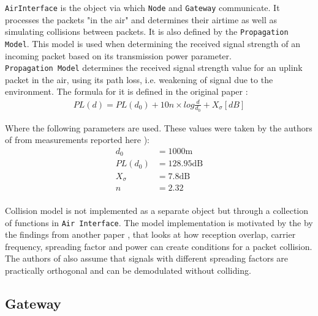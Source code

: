 \texttt{AirInterface} is the object via which \texttt{Node} and \texttt{Gateway} communicate. It processes the packets "in the air" and determines their airtime as well as simulating collisions between packets. It is also defined by the \texttt{Propagation Model}.
This model is used when determining the received signal
strength of an incoming packet based on its transmission power parameter. \\

\texttt{Propagation Model} determines the received signal strength value for an uplink packet in the air, 
using its path loss, i.e. weakening of signal due to
the environment. The formula for it is defined in the original paper \cite{simulator} :
\begin{align}
    PL(d) = PL(d_0) + 10n\times log\frac{d}{d_0} + X_{\sigma} [dB] \label{eq:propagation_model}
\end{align}

Where the following parameters are used. These values were taken by the authors of \cite{simulator} from measurements reported here \cite{propagation_model_parameters}):
\begin{align*}
     d_0 & = 1000 \text{m}\\
     PL(d_0) & = 128.95 \text{dB}\\
     X_{\sigma} & = 7.8 \text{dB}\\
     n & = 2.32\\
\end{align*}

Collision model is not implemented as a separate object but through a collection of functions in \texttt{Air Interface}. The model implementation is motivated by the by the findings from another paper \cite{collision_conditions}, that looks at how reception overlap, carrier frequency, spreading factor and power can create conditions for a packet collision. The authors of \cite{simulator} also assume that signals with different spreading factors are practically orthogonal and can be demodulated without colliding.\\


\subsection{Gateway}

